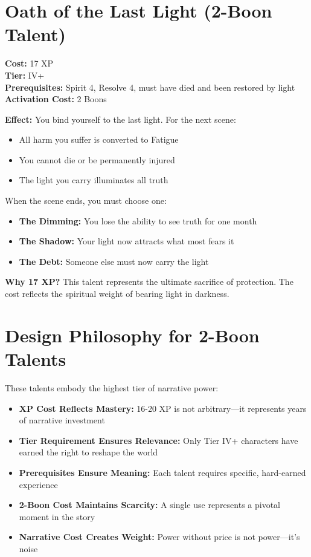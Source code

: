 \documentclass[11pt]{book}
\begin{document}
\section{Oath of the Last Light (2-Boon Talent)}
\textbf{Cost:} 17 XP \\
\textbf{Tier:} IV+ \\
\textbf{Prerequisites:} Spirit 4, Resolve 4, must have died and been restored by light \\
\textbf{Activation Cost:} 2 Boons

\textbf{Effect:} You bind yourself to the last light. For the next scene:
\begin{itemize}
  \item All harm you suffer is converted to Fatigue
  \item You cannot die or be permanently injured
  \item The light you carry illuminates all truth
\end{itemize}

When the scene ends, you must choose one:
\begin{itemize}
  \item \textbf{The Dimming:} You lose the ability to see truth for one month
  \item \textbf{The Shadow:} Your light now attracts what most fears it
  \item \textbf{The Debt:} Someone else must now carry the light
\end{itemize}

\textbf{Why 17 XP?} This talent represents the ultimate sacrifice of protection. The cost reflects the spiritual weight of bearing light in darkness.

\section{Design Philosophy for 2-Boon Talents}

These talents embody the highest tier of narrative power:

\begin{itemize}
  \item \textbf{XP Cost Reflects Mastery:} 16-20 XP is not arbitrary---it represents years of narrative investment
  \item \textbf{Tier Requirement Ensures Relevance:} Only Tier IV+ characters have earned the right to reshape the world
  \item \textbf{Prerequisites Ensure Meaning:} Each talent requires specific, hard-earned experience
  \item \textbf{2-Boon Cost Maintains Scarcity:} A single use represents a pivotal moment in the story
  \item \textbf{Narrative Cost Creates Weight:} Power without price is not power---it's noise
\end{itemize}
\end{document}
